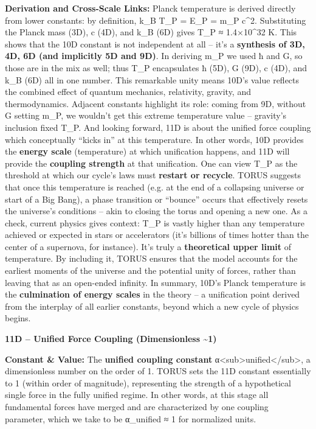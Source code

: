\documentclass[
]{article}
\begin{document}
\textbf{Derivation and Cross-Scale Links:} Planck temperature is derived
directly from lower constants: by definition, k\_B T\_P = E\_P = m\_P
c\^{}2\hspace{0pt}. Substituting the Planck mass (3D), c (4D), and k\_B
(6D) gives T\_P ≈ 1.4×10\^{}32 K\hspace{0pt}. This shows that the 10D
constant is not independent at all -- it's a \textbf{synthesis of 3D,
4D, 6D (and implicitly 5D and 9D)}\hspace{0pt}. In deriving m\_P we used
ħ and G, so those are in the mix as well; thus T\_P encapsulates ħ (5D),
G (9D), c (4D), and k\_B (6D) all in one number\hspace{0pt}. This
remarkable unity means 10D's value reflects the combined effect of
quantum mechanics, relativity, gravity, and thermodynamics. Adjacent
constants highlight its role: coming from 9D, without G setting m\_P, we
wouldn't get this extreme temperature value -- gravity's inclusion fixed
T\_P. And looking forward, 11D is about the unified force coupling which
conceptually ``kicks in'' at this temperature. In other words, 10D
provides the \textbf{energy scale} (temperature) at which unification
happens, and 11D will provide the \textbf{coupling strength} at that
unification\hspace{0pt}. One can view T\_P as the threshold at which our
cycle's laws must \textbf{restart or recycle}. TORUS suggests that once
this temperature is reached (e.g. at the end of a collapsing universe or
start of a Big Bang), a phase transition or ``bounce'' occurs that
effectively resets the universe's conditions -- akin to closing the
torus and opening a new one\hspace{0pt}. As a check, current physics
gives context: T\_P is vastly higher than any temperature achieved or
expected in stars or accelerators (it's billions of times hotter than
the center of a supernova, for instance). It's truly a
\textbf{theoretical upper limit} of temperature. By including it, TORUS
ensures that the model accounts for the earliest moments of the universe
and the potential unity of forces, rather than leaving that as an
open-ended infinity. In summary, 10D's Planck temperature is the
\textbf{culmination of energy scales} in the theory -- a unification
point derived from the interplay of all earlier constants, beyond which
a new cycle of physics begins.

\textbf{11D -- Unified Force Coupling (Dimensionless \textasciitilde1)}

\textbf{Constant \& Value:} The \textbf{unified coupling constant}
α\textless sub\textgreater unified\textless/sub\textgreater, a
dimensionless number on the order of 1\hspace{0pt}. TORUS sets the 11D
constant essentially to 1 (within order of magnitude), representing the
strength of a hypothetical single force in the fully unified regime. In
other words, at this stage all fundamental forces have merged and are
characterized by one coupling parameter, which we take to be α\_unified
≈ 1 for normalized units.
\end{document}
